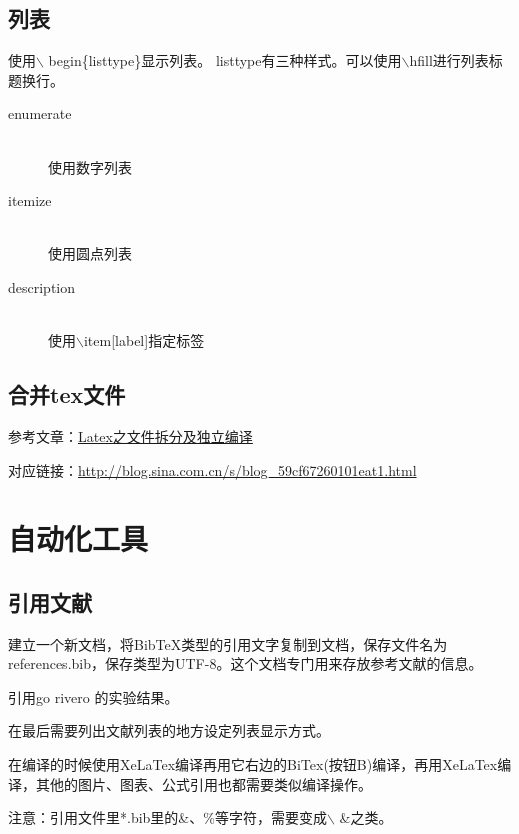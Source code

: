 \documentclass[a4paper,10 pt, conference]{article}     %
\begin{document}
    \subsection{列表}
    
    使用$\backslash$ begin\{listtype\}显示列表。 listtype有三种样式。可以使用$\backslash$hfill进行列表标题换行。
    
    \begin{description}
    \item[enumerate] \hfill \\
    使用数字列表
    \item[itemize] \hfill \\
    使用圆点列表
    \item[description] \hfill \\
    使用$\backslash$item[label]指定标签
    \end{description}

    \subsection{合并tex文件}

    参考文章：\href{http://blog.sina.com.cn/s/blog_59cf67260101eat1.html}{Latex之文件拆分及独立编译}

    对应链接：\url{http://blog.sina.com.cn/s/blog_59cf67260101eat1.html}

\section{自动化工具}

    \subsection{引用文献}

    建立一个新文档，将BibTeX类型的引用文字复制到文档，保存文件名为references.bib，保存类型为UTF-8。这个文档专门用来存放参考文献的信息。

    引用go \cite{gostout1992clinical}rivero \cite{rivero2001resistance} 的实验结果。

    在最后需要列出文献列表的地方设定列表显示方式。

    在编译的时候使用XeLaTex编译再用它右边的BiTex(按钮B)编译，再用XeLaTex编译，其他的图片、图表、公式引用也都需要类似编译操作。

    注意：引用文件里*.bib里的\&、\%等字符，需要变成$\backslash$ \&之类。
\end{document}
